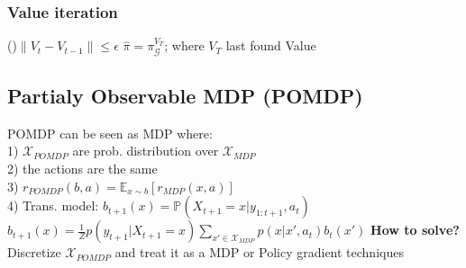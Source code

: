 \subsubsection{Value iteration}
    \begin{algorithm}[H]
        \While(){$\left\lVert  V_t - V_{t-1}\right\rVert \leq \epsilon$}{
        }
        $\hat{\pi} = \pi_\mathcal{G}^{V_T}$; where $V_T$ last found Value
\end{algorithm}

\subsection{Partialy Observable MDP (POMDP)}
POMDP can be seen as MDP where:\\
1) $\mathcal{X}_{POMDP}$ are prob. distribution over $\mathcal{X}_{MDP}$\\
2) the actions are the same\\
3) $r_{POMDP}(b, a)= \mathbb{E}_{x\sim b}\left[r_{MDP}(x, a)\right]$\\
4) Trans. model: $b_{t+1}(x) = \mathbb{P}(X_{t+1}=x\vert y_{1:t+1}, a_t)$\\
$b_{t+1}(x) =${\scriptsize $\frac{1}{Z}p(y_{t+1}\vert X_{t+1}=x)\sum_{x'\in \mathcal{X}_{MDP}}p(x\vert x', a_t)b_t(x')$}
\textbf{How to solve?} Discretize $\mathcal{X}_{POMDP}$ and treat it as a MDP or Policy gradient techniques